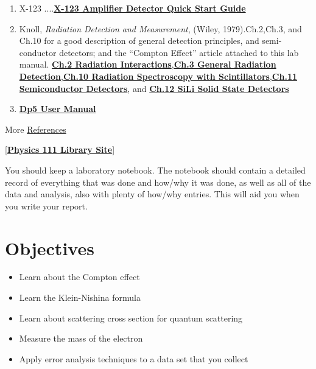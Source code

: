 \documentclass{../lab}
\begin{document}
\begin{enumerate}
    \item X-123 ....\href{http://experimentationlab.berkeley.edu/sites/default/files/images/X-123.pdf}{\textbf{X-123 Amplifier Detector Quick Start Guide}}

    \item Knoll, \emph{Radiation Detection and Measurement}, (Wiley, 1979).Ch.2,Ch.3, and Ch.10 for a good description of general detection principles, and semi-conductor detectors; and the ``Compton Effect'' article attached to this lab manual. \href{http://physics111.lib.berkeley.edu/Physics111/Reprints/COM/01-Radiation\_Detection\_and\_Measurement\_CH\_02.pdf}{\textbf{Ch.2 Radiation Interactions}},\href{http://physics111.lib.berkeley.edu/Physics111/Reprints/COM/01-Radiation\_Detection\_and\_Measurement\_CH\_03.pdf}{\textbf{Ch.3 General Radiation Detection}},\href{http://physics111.lib.berkeley.edu/Physics111/Reprints/COM/01-Radiation\_Detection\_and\_Measurement\_CH\_10.pdf}{\textbf{Ch.10 Radiation Spectroscopy with Scintillators}},\href{http://physics111.lib.berkeley.edu/Physics111/Reprints/COM/01-Radiation\_Detection\_and\_Measurement\_CH\_11.pdf}{\textbf{Ch.11 Semiconductor Detectors}}, and \href{http://physics111.lib.berkeley.edu/Physics111/Reprints/COM/Knoll\_ch.\%2012\%20lithium-drifted\%20germanium\%20detectors.pdf}{\textbf{Ch.12 SiLi Solid State Detectors}}

    \item \href{http://experimentationlab.berkeley.edu/sites/default/files/images/DP5\_User\_Manual\_A1.pdf}{\textbf{Dp5 User Manual}}

\end{enumerate}

More \hyperref[sec:References]{References}

[\href{\LabReprints}{\textbf{Physics 111 Library Site}}]

You should keep a laboratory notebook. The notebook should contain a detailed record of everything that was done and how/why it was done, as well as all of the data and analysis, also with plenty of how/why entries. This will aid you when you write your report.

\section{Objectives}

\begin{itemize}
    \item Learn about the Compton effect

    \item Learn the Klein-Nishina formula

    \item Learn about scattering cross section for quantum scattering

    \item Measure the mass of the electron

    \item Apply error analysis techniques to a data set that you collect

\end{itemize}
\end{document}
